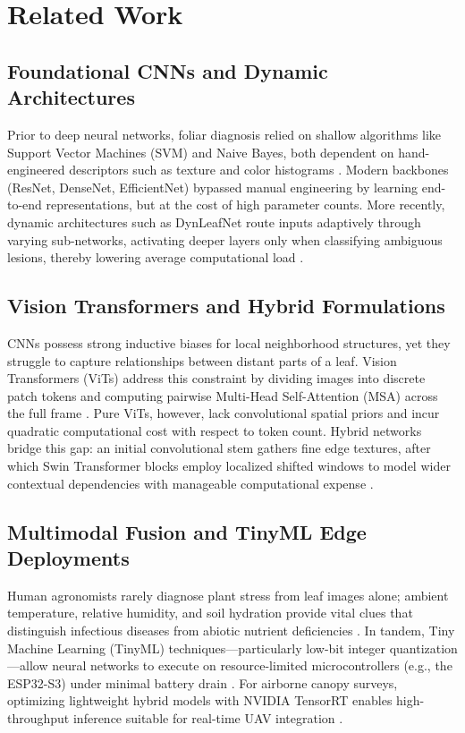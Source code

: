 \documentclass[conference]{IEEEtran}
\begin{document}
\section{Related Work}
\subsection{Foundational CNNs and Dynamic Architectures}
Prior to deep neural networks, foliar diagnosis relied on shallow algorithms like Support Vector Machines (SVM) and Naive Bayes, both dependent on hand-engineered descriptors such as texture and color histograms \cite{svm_paper}. Modern backbones (ResNet, DenseNet, EfficientNet) bypassed manual engineering by learning end-to-end representations, but at the cost of high parameter counts. More recently, dynamic architectures such as DynLeafNet route inputs adaptively through varying sub-networks, activating deeper layers only when classifying ambiguous lesions, thereby lowering average computational load \cite{mandal}.

\subsection{Vision Transformers and Hybrid Formulations}
CNNs possess strong inductive biases for local neighborhood structures, yet they struggle to capture relationships between distant parts of a leaf. Vision Transformers (ViTs) address this constraint by dividing images into discrete patch tokens and computing pairwise Multi-Head Self-Attention (MSA) across the full frame \cite{shafik}. Pure ViTs, however, lack convolutional spatial priors and incur quadratic computational cost with respect to token count. Hybrid networks bridge this gap: an initial convolutional stem gathers fine edge textures, after which Swin Transformer blocks employ localized shifted windows to model wider contextual dependencies with manageable computational expense \cite{ricegan}.

\subsection{Multimodal Fusion and TinyML Edge Deployments}
Human agronomists rarely diagnose plant stress from leaf images alone; ambient temperature, relative humidity, and soil hydration provide vital clues that distinguish infectious diseases from abiotic nutrient deficiencies \cite{xuxiaowei}. In tandem, Tiny Machine Learning (TinyML) techniques—particularly low-bit integer quantization—allow neural networks to execute on resource-limited microcontrollers (e.g., the ESP32-S3) under minimal battery drain \cite{malche}. For airborne canopy surveys, optimizing lightweight hybrid models with NVIDIA TensorRT enables high-throughput inference suitable for real-time UAV integration \cite{convgem}.
\end{document}
